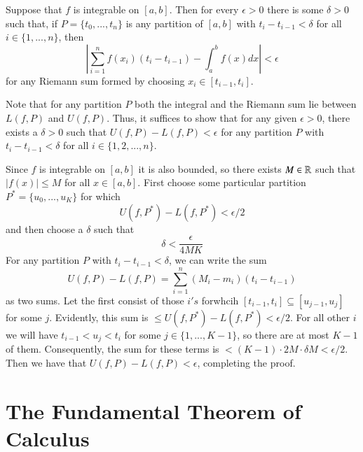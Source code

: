 \documentclass[12pt]{report}
\begin{document}
\begin{thm}{}{}
    Suppose that $f$ is integrable on $[a,b]$. Then for every $\epsilon > 0$ there is some $\delta > 0$ such that, if $P = \{t_0,...,t_n\}$ is any partition of $[a,b]$ with $t_i - t_{i-1} < \delta$ for all $i \in \{1,...,n\}$, then \begin{equation*}
        \left|\sum\limits_{i=1}^nf(x_i)(t_i-t_{i-1}) - \int_a^bf(x)dx\right| < \epsilon
    \end{equation*}
    for any Riemann sum formed by choosing $x_i \in [t_{i-1},t_i]$.
\end{thm}
\begin{proof*}{}{}
    Note that for any partition $P$ both the integral and the Riemann sum lie between $L(f,P)$ and $U(f,P)$. Thus, it suffices to show that for any given $\epsilon > 0$, there exists a $\delta > 0$ such that $U(f,P) - L(f,P) < \epsilon$ for any partition $P$ with $t_i - t_{i-1} < \delta$ for all $i \in \{1,2,...,n\}$.

    Since $f$ is integrable on $[a,b]$ it is also bounded, so there exists $M \in \mathbb R$ such that $|f(x)| \leq M$ for all $x \in [a,b]$. First choose some particular partition $P^* = \{u_0,...,u_K\}$ for which \begin{equation*}
        U(f,P^*) - L(f,P^*) < \epsilon/2
    \end{equation*}
    and then choose a $\delta$ such that \begin{equation*}
        \delta < \frac{\epsilon}{4MK}
    \end{equation*}
    For any partition $P$ with $t_i - t_{i-1} < \delta$, we can write the sum \begin{equation*}
        U(f,P) - L(f,P) = \sum_{i=1}^n(M_i-m_i)(t_i-t_{i-1})
    \end{equation*}
    as two sums. Let the first consist of those $i's$ forwhcih $[t_{i-1},t_i] \subseteq [u_{j-1},u_j]$ for some $j$. Evidently, this sum is $\leq U(f,P^*) - L(f,P^*) <\epsilon/2$. For all other $i$ we will have $t_{i-1} < u_j < t_i$ for some $j \in \{1,...,K-1\}$, so there are at most $K-1$ of them. Consequently, the sum for these terms is $< (K-1)\cdot 2M\cdot \delta M < \epsilon/2$. Then we have that $U(f,P) - L(f,P) < \epsilon$, completing the proof.
\end{proof*}


\section{The Fundamental Theorem of Calculus}
\end{document}
